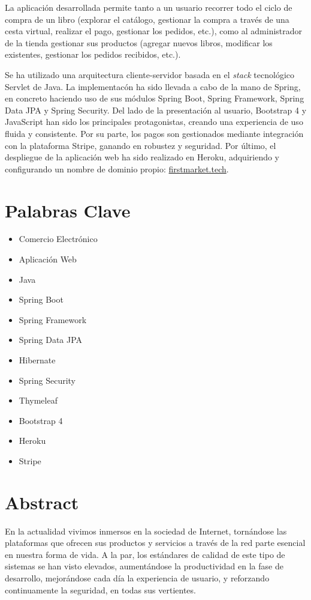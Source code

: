 \documentclass[a4paper,12pt,twoside,openright]{report}
\begin{document}
   La aplicación desarrollada permite tanto a un usuario recorrer todo el ciclo de compra de un libro (explorar el catálogo, gestionar la compra a través de una cesta virtual, realizar el pago, gestionar los pedidos, etc.), como al administrador de la tienda gestionar sus productos (agregar nuevos libros, modificar los existentes, gestionar los pedidos recibidos, etc.).
   
   Se ha utilizado una arquitectura cliente-servidor basada en el \emph{stack} tecnológico Servlet de Java. La implementacón ha sido llevada a cabo de la mano de Spring, en concreto haciendo uso de sus módulos Spring Boot, Spring Framework, Spring Data JPA y Spring Security. Del lado de la presentación al usuario, Bootstrap 4 y JavaScript han sido los principales protagonistas, creando una experiencia de uso fluida y consistente. Por su parte, los pagos son gestionados mediante integración con la plataforma Stripe, ganando en robustez y seguridad. Por último, el despliegue de la aplicación web ha sido realizado en Heroku, adquiriendo y configurando un nombre de dominio propio: \href{https://firstmarket.tech}{firstmarket.tech}.
   \pagebreak
   
   \section*{Palabras Clave}
   \thispagestyle{empty}
   \begin{itemize}
   		\item Comercio Electrónico
	   	\item Aplicación Web
	   	\item Java
	   	\item Spring Boot
	   	\item Spring Framework
	   	\item Spring Data JPA
	   	\item Hibernate
	   	\item Spring Security
	   	\item Thymeleaf
	   	\item Bootstrap 4
	   	\item Heroku
	   	\item Stripe
   \end{itemize}
   \clearpage
   
   \section*{Abstract}
   \thispagestyle{empty}
   En la actualidad vivimos inmersos en la sociedad de Internet, tornándose las plataformas que ofrecen sus productos y servicios a través de la red parte esencial en nuestra forma de vida. A la par, los estándares de calidad de este tipo de sistemas se han visto elevados, aumentándose la productividad en la fase de desarrollo, mejorándose cada día la experiencia de usuario, y reforzando continuamente la seguridad, en todas sus vertientes.
   
\end{document}
